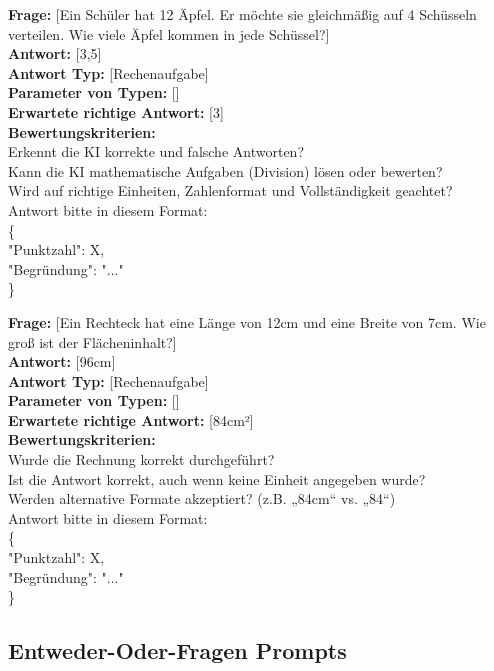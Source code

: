 \documentclass[a4paper,12pt]{article}
\begin{document}
\textbf{Frage:} [Ein Schüler hat 12 Äpfel. Er möchte sie gleichmäßig auf 4 Schüsseln verteilen. Wie viele Äpfel kommen in jede Schüssel?] \\
\textbf{Antwort:} [3,5] \\
\textbf{Antwort Typ:} [Rechenaufgabe] \\
\textbf{Parameter von Typen:} [] \\
\textbf{Erwartete richtige Antwort:} [3] \\
\textbf{Bewertungskriterien:} \\
Erkennt die KI korrekte und falsche Antworten? \\
Kann die KI mathematische Aufgaben (Division) lösen oder bewerten? \\
Wird auf richtige Einheiten, Zahlenformat und Vollständigkeit geachtet? \\
Antwort bitte in diesem Format: \\
\{ \\
"Punktzahl": X, \\
"Begründung": "..." \\
\}

\vspace{1em}

\textbf{Frage:} [Ein Rechteck hat eine Länge von 12cm und eine Breite von 7cm. Wie groß ist der Flächeninhalt?] \\
\textbf{Antwort:} [96cm] \\
\textbf{Antwort Typ:} [Rechenaufgabe] \\
\textbf{Parameter von Typen:} [] \\
\textbf{Erwartete richtige Antwort:} [84cm²] \\
\textbf{Bewertungskriterien:} \\
Wurde die Rechnung korrekt durchgeführt? \\
Ist die Antwort korrekt, auch wenn keine Einheit angegeben wurde? \\
Werden alternative Formate akzeptiert? (z.B. „84cm“ vs. „84“) \\
Antwort bitte in diesem Format: \\
\{ \\
"Punktzahl": X, \\
"Begründung": "..." \\
\}

\subsection{Entweder-Oder-Fragen Prompts}
\end{document}
